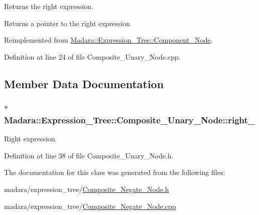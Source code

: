 Returns the right expression. 

\begin{DoxyReturn}{Returns}
a pointer to the right expression 
\end{DoxyReturn}


Reimplemented from \hyperlink{classMadara_1_1Expression__Tree_1_1Component__Node_a672f2b18b4e63efda38e9063a47bc30f}{Madara::Expression\_\-Tree::Component\_\-Node}.



Definition at line 24 of file Composite\_\-Unary\_\-Node.cpp.



\subsection{Member Data Documentation}
\hypertarget{classMadara_1_1Expression__Tree_1_1Composite__Unary__Node_a077b7bd1b52df6f5c6adfde735556a68}{
\subsubsection[{right\_\-}]{$\ast$ {\bf Madara::Expression\_\-Tree::Composite\_\-Unary\_\-Node::right\_\-}}}
\label{d3/dc7/classMadara_1_1Expression__Tree_1_1Composite__Unary__Node_a077b7bd1b52df6f5c6adfde735556a68}


Right expression. 



Definition at line 38 of file Composite\_\-Unary\_\-Node.h.



The documentation for this class was generated from the following files:\begin{DoxyCompactItemize}
\item 
madara/expression\_\-tree/\hyperlink{Composite__Negate__Node_8h}{Composite\_\-Negate\_\-Node.h}\item 
madara/expression\_\-tree/\hyperlink{Composite__Negate__Node_8cpp}{Composite\_\-Negate\_\-Node.cpp}\end{DoxyCompactItemize}

